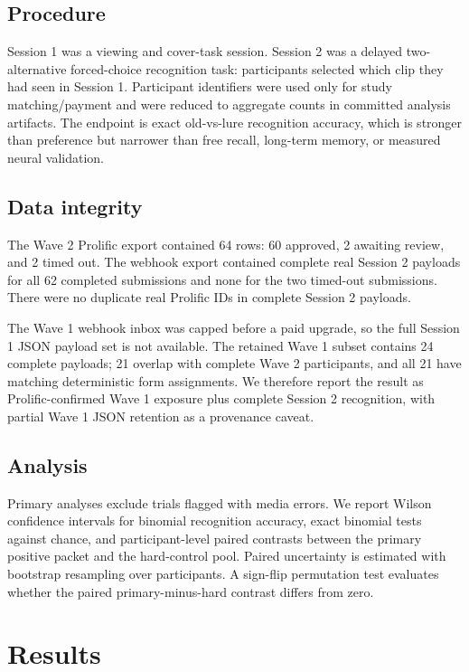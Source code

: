 \documentclass[11pt]{article}
\begin{document}
\subsection{Procedure}

Session 1 was a viewing and cover-task session. Session 2 was a delayed
two-alternative forced-choice recognition task: participants selected which clip
they had seen in Session 1. Participant identifiers were used only for study
matching/payment and were reduced to aggregate counts in committed analysis
artifacts. The endpoint is exact old-vs-lure recognition accuracy, which is
stronger than preference but narrower than free recall, long-term memory, or
measured neural validation.

\subsection{Data integrity}

The Wave 2 Prolific export contained 64 rows: 60 approved, 2 awaiting review,
and 2 timed out. The webhook export contained complete real Session 2 payloads
for all 62 completed submissions and none for the two timed-out submissions.
There were no duplicate real Prolific IDs in complete Session 2 payloads.

The Wave 1 webhook inbox was capped before a paid upgrade, so the full Session 1
JSON payload set is not available. The retained Wave 1 subset contains 24
complete payloads; 21 overlap with complete Wave 2 participants, and all 21
have matching deterministic form assignments. We therefore report the result as
Prolific-confirmed Wave 1 exposure plus complete Session 2 recognition, with
partial Wave 1 JSON retention as a provenance caveat.

\subsection{Analysis}

Primary analyses exclude trials flagged with media errors. We report Wilson
confidence intervals for binomial recognition accuracy, exact binomial tests
against chance, and participant-level paired contrasts between the primary
positive packet and the hard-control pool. Paired uncertainty is estimated with
bootstrap resampling over participants. A sign-flip permutation test evaluates
whether the paired primary-minus-hard contrast differs from zero.

\section{Results}
\end{document}
